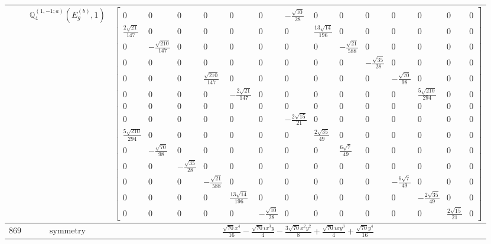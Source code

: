 \documentclass[fleqn,8pt,landscape]{jsarticle}
\begin{document}
\begin{longtable}{ccc}
$  $ & $ \mathbb{Q}_{4}^{(1,-1;a)}(E_{g}^{(b)},1) $ & $ \begin{bmatrix} 0 & 0 & 0 & 0 & 0 & 0 & - \frac{\sqrt{10}}{28} & 0 & 0 & 0 & 0 & 0 & 0 & 0 \\ \frac{2 \sqrt{21}}{147} & 0 & 0 & 0 & 0 & 0 & 0 & \frac{13 \sqrt{14}}{196} & 0 & 0 & 0 & 0 & 0 & 0 \\ 0 & - \frac{\sqrt{210}}{147} & 0 & 0 & 0 & 0 & 0 & 0 & - \frac{\sqrt{21}}{588} & 0 & 0 & 0 & 0 & 0 \\ 0 & 0 & 0 & 0 & 0 & 0 & 0 & 0 & 0 & - \frac{\sqrt{35}}{28} & 0 & 0 & 0 & 0 \\ 0 & 0 & 0 & \frac{\sqrt{210}}{147} & 0 & 0 & 0 & 0 & 0 & 0 & - \frac{\sqrt{70}}{98} & 0 & 0 & 0 \\ 0 & 0 & 0 & 0 & - \frac{2 \sqrt{21}}{147} & 0 & 0 & 0 & 0 & 0 & 0 & \frac{5 \sqrt{210}}{294} & 0 & 0 \\ 0 & 0 & 0 & 0 & 0 & 0 & 0 & 0 & 0 & 0 & 0 & 0 & 0 & 0 \\ 0 & 0 & 0 & 0 & 0 & 0 & - \frac{2 \sqrt{15}}{21} & 0 & 0 & 0 & 0 & 0 & 0 & 0 \\ \frac{5 \sqrt{210}}{294} & 0 & 0 & 0 & 0 & 0 & 0 & \frac{2 \sqrt{35}}{49} & 0 & 0 & 0 & 0 & 0 & 0 \\ 0 & - \frac{\sqrt{70}}{98} & 0 & 0 & 0 & 0 & 0 & 0 & \frac{6 \sqrt{7}}{49} & 0 & 0 & 0 & 0 & 0 \\ 0 & 0 & - \frac{\sqrt{35}}{28} & 0 & 0 & 0 & 0 & 0 & 0 & 0 & 0 & 0 & 0 & 0 \\ 0 & 0 & 0 & - \frac{\sqrt{21}}{588} & 0 & 0 & 0 & 0 & 0 & 0 & - \frac{6 \sqrt{7}}{49} & 0 & 0 & 0 \\ 0 & 0 & 0 & 0 & \frac{13 \sqrt{14}}{196} & 0 & 0 & 0 & 0 & 0 & 0 & - \frac{2 \sqrt{35}}{49} & 0 & 0 \\ 0 & 0 & 0 & 0 & 0 & - \frac{\sqrt{10}}{28} & 0 & 0 & 0 & 0 & 0 & 0 & \frac{2 \sqrt{15}}{21} & 0 \end{bmatrix} $ \\ \hline
$ 869 $ & $ \text{symmetry} $ & $ \frac{\sqrt{70} x^{4}}{16} - \frac{\sqrt{70} i x^{3} y}{4} - \frac{3 \sqrt{70} x^{2} y^{2}}{8} + \frac{\sqrt{70} i x y^{3}}{4} + \frac{\sqrt{70} y^{4}}{16} $ \\

\end{longtable}
\end{document}
